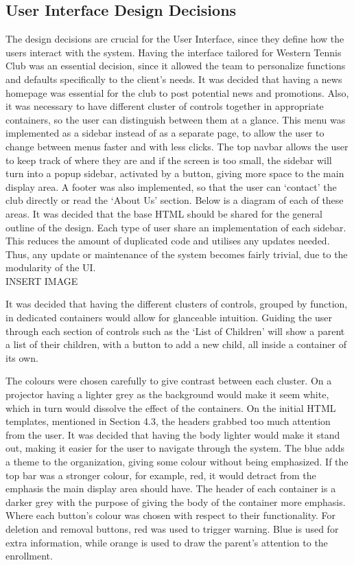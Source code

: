 \documentclass{l3proj}
\begin{document}
\subsection{User Interface Design Decisions}
The design decisions are crucial for the User Interface, since they define how the users interact with the system. Having the interface tailored for Western Tennis Club was an essential decision, since it allowed the team to personalize functions and defaults specifically to the client's needs. It was decided that having a news homepage was essential for the club to post potential news and promotions. Also, it was necessary to have different cluster of controls together in appropriate containers, so the user can distinguish between them at a glance. This menu was implemented as a sidebar instead of as a separate page, to allow the user to change between menus faster and with less clicks. The top navbar allows the user to keep track of where they are and if the screen is too small, the sidebar will turn into a popup sidebar, activated by a button, giving more space to the main display area. A footer was also implemented, so that the user can `contact' the club directly or read the `About Us' section. Below is a diagram of each of these areas. It was decided that the base HTML should be shared for the general outline of the design. Each type of user share an implementation of each sidebar. This reduces the amount of duplicated code and utilises any updates needed. Thus, any update or maintenance of the system becomes fairly trivial, due to the modularity of the UI.\\
{\LARGE{INSERT IMAGE}}
\par It was decided that having the different clusters of controls, grouped by function, in dedicated containers would allow for glanceable intuition. Guiding the user through each section of controls such as the `List of Children' will show a parent a list of their children, with a button to add a new child, all inside a container of its own.\\
\par The colours were chosen carefully to give contrast between each cluster. On a projector having a lighter grey as the background would make it seem white, which in turn would dissolve the effect of the containers. On the initial HTML templates, mentioned in Section 4.3, the headers grabbed too much attention from the user. It was decided that having the body lighter would make it stand out, making it easier for the user to navigate through the system. The blue adds a theme to the organization, giving some colour without being emphasized. If the top bar was a stronger colour,  for example, red, it would detract from the emphasis the main display area should have. The header of each container is a darker grey with the purpose of giving the body of the container more emphasis. Where each button’s colour was chosen with respect to their functionality. For deletion and removal buttons, red was used to trigger warning. Blue is used for extra information, while orange is used to draw the parent’s attention to the enrollment. \\
\end{document}
